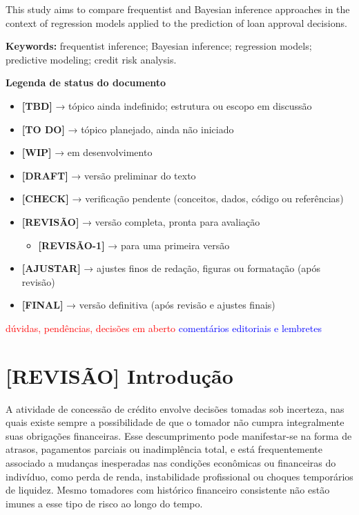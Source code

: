 \documentclass[
  brazilian,
  12pt,
  letterpaper,
  DIV=11,
  numbers=noendperiod]{scrartcl}
\providecommand{\tightlist}{%
  \setlength{\itemsep}{0pt}\setlength{\parskip}{0pt}}
\newcommand{\red}[1]{\textcolor{red}{#1}}
\newcommand{\blue}[1]{\textcolor{blue}{#1}}
\begin{document}
\vspace{1cm}

This study aims to compare frequentist and Bayesian inference approaches in the context of regression models applied to the prediction of loan approval decisions. 

\vspace{1cm}

\noindent\textbf{Keywords:} frequentist inference; Bayesian inference; regression models; predictive modeling; credit risk analysis.
\newpage

\tableofcontents
\newpage

\textbf{Legenda de status do documento}

\begin{itemize}
\tightlist
\item
  \textbf{{[}TBD{]}} → tópico ainda indefinido; estrutura ou escopo em
  discussão
\item
  \textbf{{[}TO DO{]}} → tópico planejado, ainda não iniciado
\item
  \textbf{{[}WIP{]}} → em desenvolvimento
\item
  \textbf{{[}DRAFT{]}} → versão preliminar do texto
\item
  \textbf{{[}CHECK{]}} → verificação pendente (conceitos, dados, código
  ou referências)
\item
  \textbf{{[}REVISÃO{]}} → versão completa, pronta para avaliação

  \begin{itemize}
  \tightlist
  \item
    \textbf{{[}REVISÃO-1{]}} → para uma primeira versão
  \end{itemize}
\item
  \textbf{{[}AJUSTAR{]}} → ajustes finos de redação, figuras ou
  formatação (após revisão)
\item
  \textbf{{[}FINAL{]}} → versão definitiva (após revisão e ajustes
  finais)
\end{itemize}

\red{dúvidas, pendências, decisões em aberto}
\blue{comentários editoriais e lembretes}

\section{{[}REVISÃO{]} Introdução}\label{revisuxe3o-introduuxe7uxe3o}

A atividade de concessão de crédito envolve decisões tomadas sob
incerteza, nas quais existe sempre a possibilidade de que o tomador não
cumpra integralmente suas obrigações financeiras. Esse descumprimento
pode manifestar-se na forma de atrasos, pagamentos parciais ou
inadimplência total, e está frequentemente associado a mudanças
inesperadas nas condições econômicas ou financeiras do indivíduo, como
perda de renda, instabilidade profissional ou choques temporários de
liquidez. Mesmo tomadores com histórico financeiro consistente não estão
imunes a esse tipo de risco ao longo do tempo.
\end{document}
